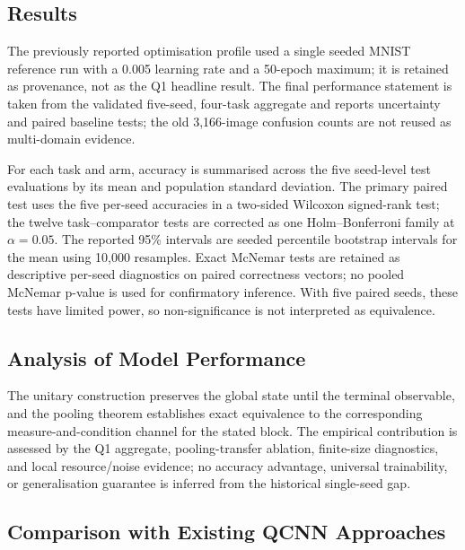 \documentclass[conference]{IEEEtran}
\begin{document}
\subsection{Results}
\label{sec:results}
The previously reported optimisation profile used a single seeded MNIST
reference run with a 0.005 learning rate and a 50-epoch maximum; it is retained
as provenance, not as the Q1 headline result. The final performance statement is
taken from the validated five-seed, four-task aggregate and reports uncertainty
and paired baseline tests; the old 3,166-image confusion counts are not reused as
multi-domain evidence.

For each task and arm, accuracy is summarised across the five seed-level test
evaluations by its mean and population standard deviation. The primary paired
test uses the five per-seed accuracies in a two-sided Wilcoxon signed-rank test;
the twelve task--comparator tests are corrected as one Holm--Bonferroni family at
$\alpha=0.05$. The reported 95\% intervals are seeded percentile bootstrap
intervals for the mean using 10,000 resamples. Exact McNemar tests are retained
as descriptive per-seed diagnostics on paired correctness vectors; no pooled
McNemar p-value is used for confirmatory inference. With five paired seeds, these
tests have limited power, so non-significance is not interpreted as equivalence.

\subsection{Analysis of Model Performance}
The unitary construction preserves the global state until the terminal observable, and the pooling theorem establishes exact equivalence to the corresponding measure-and-condition channel for the stated block. The empirical contribution is assessed by the Q1 aggregate, pooling-transfer ablation, finite-size diagnostics, and local resource/noise evidence; no accuracy advantage, universal trainability, or generalisation guarantee is inferred from the historical single-seed gap.

\subsection{Comparison with Existing QCNN Approaches}
\end{document}
